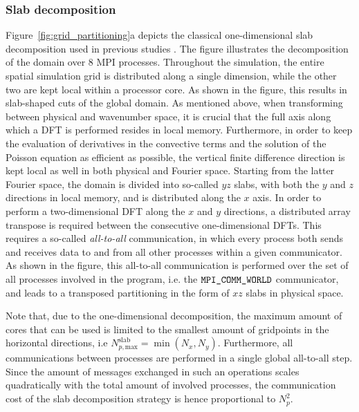 \subsubsection{Slab decomposition} 
Figure~\ref{fig:grid_partitioning}a depicts the classical one-dimensional slab decomposition used in previous studies \cite{delport2009constrained, calaf2010large, goit2015optimal}. The figure illustrates the decomposition of the domain over 8 MPI processes. Throughout the simulation, the entire spatial simulation grid is distributed along a single dimension, while the other two are kept local within a processor core. As shown in the figure, this results in slab-shaped cuts of the global domain. As mentioned above, when transforming between physical and wavenumber space, it is crucial that the full axis along which a DFT is performed resides in local memory. Furthermore, in order to keep the evaluation of derivatives in the convective terms and the solution of the Poisson equation as efficient as possible, the vertical finite difference direction is kept local as well in both physical and Fourier space. Starting from the latter Fourier space, the domain is divided into so-called $yz$ slabs, with both the $y$ and $z$ directions in local memory, and is distributed along the $x$ axis.  In order to perform a two-dimensional DFT along the $x$ and $y$ directions, a distributed array transpose is required between the consecutive one-dimensional DFTs. This requires a so-called \emph{all-to-all} communication, in which every process both sends and receives data to and from all other processes within a given communicator. As shown in the figure, this all-to-all communication is performed over the set of all processes involved in the program, i.e. the $\verb|MPI_COMM_WORLD|$ communicator, and leads to a transposed partitioning in the form of $xz$ slabs in physical space. 

Note that, due to the one-dimensional decomposition, the maximum amount of cores that can be used is limited to the smallest amount of gridpoints in the horizontal directions, i.e $N_{p,\text{max}}^{\text{slab}} = \min(N_x, N_y)$. Furthermore, all communications between processes are performed in a single global all-to-all step. Since the amount of messages exchanged in such an operations scales quadratically with the total amount of involved processes, the communication cost of the slab decomposition strategy is hence proportional to $N_p^2$.

